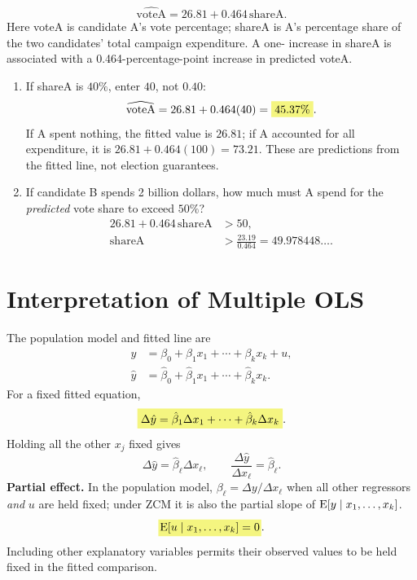 \begin{exercise}\label{ex:election}
\[\widehat{\mathrm{voteA}}=26.81+0.464\,\mathrm{shareA}.\]
Here voteA is candidate A's vote percentage; shareA is A's percentage share of the two candidates' total campaign expenditure. A one- increase in shareA is associated with a 0.464-percentage-point increase in predicted voteA.
\begin{enumerate}
\item If shareA is $40\%$, enter $40$, not $0.40$:
\[\widehat{\mathrm{voteA}}=26.81+0.464(40)=\hm{45.37\%}.\]
If A spent nothing, the fitted value is $26.81$; if A accounted for all expenditure, it is $26.81+0.464(100)=73.21$. These are predictions from the fitted line, not election guarantees.
\item If candidate B spends 2 billion dollars, how much must A spend for the \emph{predicted} vote share to exceed $50\%$?
\begin{align*}
26.81+0.464\,\mathrm{shareA}&>50,\\
\mathrm{shareA}&>\frac{23.19}{0.464}=49.978448\ldots.
\end{align*}
\end{enumerate}
\end{exercise}

\section{Interpretation of Multiple OLS}
\label{sec:multiple-interpretation}
The population model and fitted line are
\begin{align}
y&=\beta_0+\beta_1x_1+\cdots+\beta_kx_k+u,\label{eq:multiple-model}\\
\hat y&=\hat\beta_0+\hat\beta_1x_1+\cdots+\hat\beta_kx_k.\label{eq:multiple-fitted}
\end{align}
For a fixed fitted equation,
\[\hm{\Delta\hat y=\hat\beta_1\Delta x_1+\cdots+\hat\beta_k\Delta x_k}.\]
Holding all the other $x_j$ fixed gives
\[\Delta\hat y=\hat\beta_\ell\Delta x_\ell,
\qquad\frac{\Delta\hat y}{\Delta x_\ell}=\hat\beta_\ell.
\]
\textbf{Partial effect.} In the population model, $\beta_\ell=\Delta y/\Delta x_\ell$ when all other regressors \emph{and} $u$ are held fixed; under ZCM it is also the partial slope of $\operatorname{E}[y\mid x_1,\ldots,x_k]$.
\[\hy{$\E[u\mid x_1,\ldots,x_k]=0$}.\]
Including other explanatory variables permits their observed values to be held fixed in the fitted comparison. 

